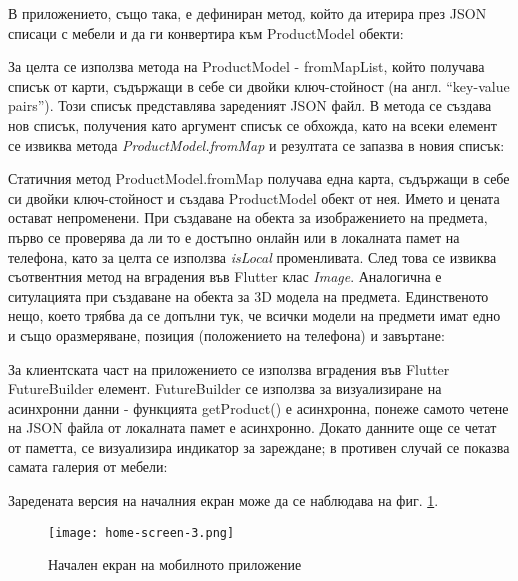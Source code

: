 В приложението, също така, е дефиниран метод, който да итерира през JSON списаци с мебели и да ги конвертира към ProductModel обекти:


За целта се използва метода на ProductModel - fromMapList, който получава списък от карти, съдържащи в себе си двойки ключ-стойност (на англ. ``key-value pairs''). Този списък представлява зареденият JSON файл. В метода се създава нов списък, получения като аргумент списък се обхожда, като на всеки елемент се извиква метода \emph{ProductModel.fromMap} и резултата се запазва в новия списък:


Статичния метод ProductModel.fromMap получава една карта, съдържащи в себе си двойки ключ-стойност и създава ProductModel обект от нея. Името и цената остават непроменени. При създаване на обекта за изображението на предмета, първо се проверява да ли то е достъпно онлайн или в локалната памет на телефона, като за целта се използва \emph{isLocal} променливата. След това се извиква съотвентния метод на вградения във Flutter клас \emph{Image}. Аналогична е ситулацията при създаване на обекта за 3D модела на предмета. Единственото нещо, което трябва да се допълни тук, че всички модели на предмети имат едно и също оразмеряване, позиция (положението на телефона) и завъртане:


За клиентската част на приложението се използва вградения във Flutter FutureBuilder елемент. FutureBuilder се използва за визуализиране на асинхронни данни - функцията getProduct() е асинхронна, понеже самото четене на JSON файла от локалната памет е асинхронно. Докато данните още се четат от паметта, се визуализира индикатор за зареждане; в противен случай се показва самата галерия от мебели:


Заредената версия на началния екран може да се наблюдава на фиг. \ref{fig:home-screen-in-3}.

\begin{figure}[H]
    \texttt{[image: home-screen-3.png]}
    \centering
    \caption{Начален екран на мобилното приложение}
    \label{fig:home-screen-in-3}
\end{figure}
